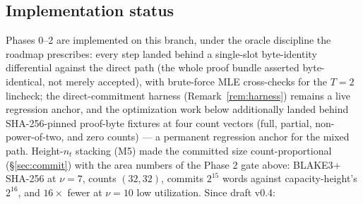 \documentclass[11pt]{article}
\theoremstyle{definition}
\begin{document}
\subsection*{Implementation status}

Phases 0--2 are implemented on this branch, under the oracle discipline
the roadmap prescribes: every step landed behind a single-slot
byte-identity differential against the direct path (the whole proof
bundle asserted byte-identical, not merely accepted), with brute-force
MLE cross-checks for the $T = 2$ lincheck; the direct-commitment harness
(Remark~\ref{rem:harness}) remains a live regression anchor, and the
optimization work below additionally landed behind SHA-256-pinned
proof-byte fixtures at four count vectors (full, partial,
non-power-of-two, and zero counts) --- a permanent regression anchor
for the mixed path. Height-$n_t$
stacking (M5) made the committed size
count-proportional (\S\ref{sec:commit}) with the area numbers of the
Phase 2 gate above: BLAKE3$+$SHA-256 at $\nu = 7$, counts $(32, 32)$,
commits $2^{15}$ words against capacity-height's $2^{16}$, and $16\times$
fewer at $\nu = 10$ low utilization. Since draft v0.4:
\end{document}
